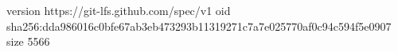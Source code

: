 version https://git-lfs.github.com/spec/v1
oid sha256:dda986016c0bfe67ab3eb473293b11319271c7a7e025770af0c94c594f5e0907
size 5566
